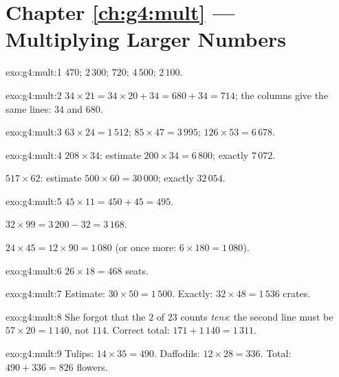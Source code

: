 \section*{Chapter \ref{ch:g4:mult} --- Multiplying Larger Numbers}

\begin{solution}{exo:g4:mult:1}
$470$; \quad $2\,300$; \quad $720$; \quad $4\,500$; \quad
$2\,100$.
\end{solution}

\begin{solution}{exo:g4:mult:2}
$34 \times 21 = 34 \times 20 + 34 = 680 + 34 = 714$; the columns
give the same lines: $34$ and $680$.
\end{solution}

\begin{solution}{exo:g4:mult:3}
$63 \times 24 = 1\,512$; \quad
$85 \times 47 = 3\,995$; \quad
$126 \times 53 = 6\,678$.
\end{solution}

\begin{solution}{exo:g4:mult:4}
$208 \times 34$: estimate $200 \times 34 = 6\,800$; exactly
$7\,072$.

$517 \times 62$: estimate $500 \times 60 = 30\,000$; exactly
$32\,054$.
\end{solution}

\begin{solution}{exo:g4:mult:5}
$45 \times 11 = 450 + 45 = 495$.

$32 \times 99 = 3\,200 - 32 = 3\,168$.

$24 \times 45 = 12 \times 90 = 1\,080$ (or once more:
$6 \times 180 = 1\,080$).
\end{solution}

\begin{solution}{exo:g4:mult:6}
$26 \times 18 = 468$ seats.
\end{solution}

\begin{solution}{exo:g4:mult:7}
Estimate: $30 \times 50 = 1\,500$. Exactly:
$32 \times 48 = 1\,536$ crates.
\end{solution}

\begin{solution}{exo:g4:mult:8}
She forgot that the $2$ of $23$ counts \emph{tens}: the second line
must be $57 \times 20 = 1\,140$, not $114$. Correct total:
$171 + 1\,140 = 1\,311$.
\end{solution}

\begin{solution}{exo:g4:mult:9}
Tulips: $14 \times 35 = 490$. Daffodils: $12 \times 28 = 336$.
Total: $490 + 336 = 826$ flowers.
\end{solution}


